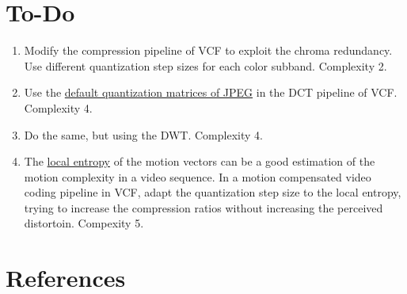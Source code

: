 \section{To-Do}
\begin{enumerate}
\item Modify the compression pipeline of VCF to exploit the chroma
  redundancy. Use different quantization step sizes for each color
  subband. Complexity 2.
\item Use the
  \href{https://www.academia.edu/10152058/The_Optimal_Quantization_Matrices_for_JPEG_Image_Compression_From_Psychovisual_Threshold?email_work_card=view-paper}{default
    quantization matrices of JPEG} in the DCT pipeline of
  VCF. Complexity 4.
\item Do the same, but using the DWT. Complexity 4.
\item The
  \href{https://scikit-image.org/docs/stable/auto_examples/filters/plot_entropy.html}{local
    entropy} of the motion vectors can be a good estimation of the
  motion complexity in a video sequence. In a motion compensated video
  coding pipeline in VCF, adapt the quantization step size to the
  local entropy, trying to increase the compression ratios without
  increasing the perceived distortoin. Compexity 5.
\end{enumerate}

\section{References}

\renewcommand{\addcontentsline}[3]{}%


